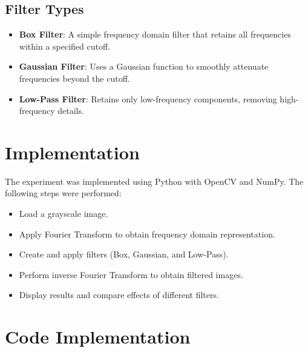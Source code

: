 \documentclass{report}
\begin{document}
\subsection{Filter Types}
\begin{itemize}
    \item \textbf{Box Filter}: A simple frequency domain filter that retains all frequencies within a specified cutoff.
    \item \textbf{Gaussian Filter}: Uses a Gaussian function to smoothly attenuate frequencies beyond the cutoff.
    \item \textbf{Low-Pass Filter}: Retains only low-frequency components, removing high-frequency details.
\end{itemize}

\section{Implementation}
The experiment was implemented using Python with OpenCV and NumPy. The following steps were performed:

\begin{itemize}
    \item Load a grayscale image.
    \item Apply Fourier Transform to obtain frequency domain representation.
    \item Create and apply filters (Box, Gaussian, and Low-Pass).
    \item Perform inverse Fourier Transform to obtain filtered images.
    \item Display results and compare effects of different filters.
\end{itemize}

\section{Code Implementation}

\end{document}
